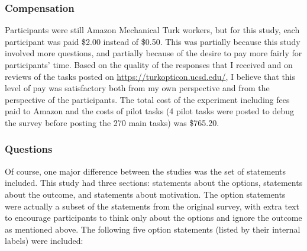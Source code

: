 \subsubsection{Compensation}

Participants were still Amazon Mechanical Turk workers, but for this study, each participant was paid \$2.00 instead of \$0.50.
%
This was partially because this study involved more questions, and partially because of the desire to pay more fairly for participants' time.
%
Based on the quality of the responses that I received and on reviews of the tasks posted on \url{https://turkopticon.ucsd.edu/}, I believe that this level of pay was satisfactory both from my own perspective and from the perspective of the participants.
%
The total cost of the experiment including fees paid to Amazon and the costs of pilot tasks (4 pilot tasks were posted to debug the survey before posting the 270 main tasks) was \$765.20.


\subsubsection{Questions}

Of course, one major difference between the studies was the set of statements included.
%
This study had three sections: statements about the options, statements about the outcome, and statements about motivation.
%
The option statements were actually a subset of the statements from the original survey, with extra text to encourage participants to think only about the options and ignore the outcome as mentioned above.
%
The following five option statements (listed by their internal labels) were included: \\[0.3\baselineskip]
%
{
   \\
   \\
   \\
   \\
   \\
}


